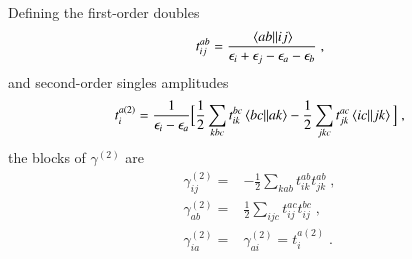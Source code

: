 \documentclass[aip,jcp,reprint,noshowkeys,superscriptaddress]{revtex4-1}
\newcommand{\eps}{\epsilon}
\begin{document}
Defining the first-order doubles 
\begin{equation}
	\label{eq:mp2_double}
t_{ij}^{ab}
=
\frac{\mel{ab}{}{ij}}{\eps_i+\eps_j-\eps_a-\eps_b} \;,
\end{equation}
and second-order singles amplitudes
\begin{equation}
t_i^{a(2)} = 
\frac{1}{\eps_i-\eps_a}
\Big[
\frac12\sum_{kbc}t_{ik}^{bc}\mel{bc}{}{ak}
-\frac12\sum_{jkc}t_{jk}^{ac}\mel{ic}{}{jk}
\Big] \;,
\end{equation}
the blocks of $\gamma^{(2)}$ are\cite{Keizer2026} 
\begin{equation}
\begin{aligned}
\gamma^{(2)}_{ij}
={}& 
-\frac12\sum_{kab}t_{ik}^{ab}t_{jk}^{ab} \;, \\
\gamma^{(2)}_{ab}
={}& 
\frac12\sum_{ijc}t_{ij}^{ac}t_{ij}^{bc} \;, \\
\gamma^{(2)}_{ia}
={}& 
\gamma^{(2)}_{ai}
=
t_i^{a(2)} \;.
\end{aligned}
\end{equation}
\end{document}
